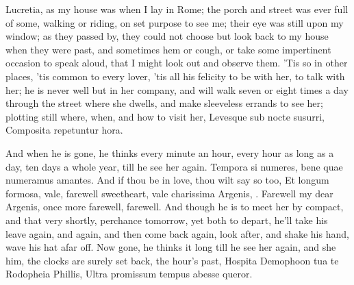 Lucretia, as my house was when I lay in Rome; the porch and street was
ever full of some, walking or riding, on set purpose to see me; their
eye was still upon my window; as they passed by, they could not choose
but look back to my house when they were past, and sometimes hem or
cough, or take some impertinent occasion to speak aloud, that I might
look out and observe them. 'Tis so in other places, 'tis common to
every lover, 'tis all his felicity to be with her, to talk with her; he
is never well but in her company, and will walk  seven or eight
times a day through the street where she dwells, and make sleeveless
errands to see her; plotting still where, when, and how to visit her,
Levesque sub nocte susurri,
Composita repetuntur hora.

And when he is gone, he thinks every minute an hour, every hour as long
as a day, ten days a whole year, till he see her again. Tempora
si numeres, bene quae numeramus amantes. And if thou be in love, thou
wilt say so too, Et longum formosa, vale, farewell sweetheart, vale
charissima Argenis, \etc{}. Farewell my dear Argenis, once more farewell,
farewell. And though he is to meet her by compact, and that very
shortly, perchance tomorrow, yet both to depart, he'll take his leave
again, and again, and then come back again, look after, and shake his
hand, wave his hat afar off. Now gone, he thinks it long till he see
her again, and she him, the clocks are surely set back, the hour's
past,
Hospita Demophoon tua te Rodopheia Phillis,
Ultra promissum tempus abesse queror.

